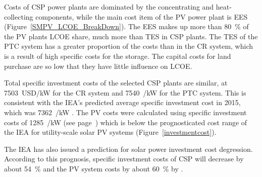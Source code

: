 Costs of \ac{CSP} power plants are dominated by the concentrating and heat-collecting components, while the main cost item of the \ac{PV} power plant is \ac{EES} (Figure~\ref{SMPV_LCOE_BreakDown}). The \ac{EES} makes up more than \SI{80}{\percent} of the \ac{PV} plants \ac{LCOE} share, much more than \ac{TES} in \ac{CSP} plants. The \ac{TES} of the \ac{PTC} system has a greater proportion of the costs than in the \ac{CR} system, which is a result of high specific costs for the storage. The capital costs for land purchase are so low that they have little influence on \ac{LCOE}. 
\pagebreak

Total specific investment costs of the selected \ac{CSP} plants are similar, at \SI{7503}{USD/kW} for the \ac{CR} system and \SI{7540}{\usd/\kilo\watt} for the \ac{PTC} system. This is consistent with the \ac{IEA}'s predicted average specific investment cost in 2015, which was \SI{7362}{\usd/\kilo\watt} \cite{IEA2014c}. The \ac{PV} costs were calculated using specific investment costs of \SI{1285}{\usd/\kilo\watt} (see page~\pageref{SUBSUBPVFinancialparameter}) which is below the prognosticated cost range of the \ac{IEA} for utility-scale solar \ac{PV} systems (Figure~\ref{investmentcost}). 


The \ac{IEA} has also issued a prediction for solar power investment cost degression. According to this prognosis, specific investment costs of \ac{CSP} will decrease by about \SI{54}{\percent} and the \ac{PV} system costs by about \SI{60}{\percent} by \cite{IEA2014c}.

